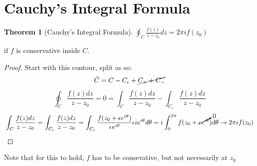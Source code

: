 \documentclass[11pt,notitlepage]{article}
\newtheorem{thm}{Theorem}[section]
\begin{document}
\section{Cauchy's Integral Formula}
\begin{thm}[Cauchy's Integral Formula]
$\oint_C \frac{f(z)}{z-z_0} dz = 2\pi i f(z_0)$ 
\end{thm}
\begin{flushright}
if $f$ is conservative inside $C$.
\end{flushright}
\begin{proof}

Start with this contour, split as so:
$$\tilde C = C - C_\epsilon +\cancel{C_{+} + C_{-}}$$
$$\oint_{\tilde C} \frac{f(z) dz}{z-z_0} 
= 0 
=\int_{C} \frac{f(z) dz}{z-z_0} -\int_{C_\epsilon} \frac{f(z) dz}{z-z_0}$$
$$\int_{C} \frac{f(z) dz}{z-z_0} 
= \int_{C_\epsilon} \frac{f(z) dz}{z-z_0}
= \int_{C_\epsilon} \frac{f(z_0 + \epsilon e^{i\theta}) }{\epsilon e^{i\theta}} \epsilon i e^{i\theta} d\theta 
= i \int_0^{2\pi} f(z_0 + \cancelto{0}{\epsilon e^{i\theta}}) d\theta \rightarrow 2\pi i f(z_0) $$
\end{proof}
Note that for this to hold, $f$ has to be consevative, but not necessarily at $z_0$
\end{document}
